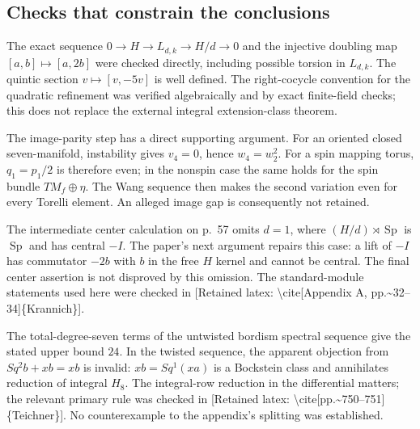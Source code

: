 \documentclass[10pt]{article}
\begin{document}
\subsection*{Checks that constrain the conclusions}
The exact sequence \(0\to H\to L_{d,k}\to H/d\to0\) and the injective doubling map \([a,b]\mapsto[a,2b]\) were checked directly, including possible torsion in \(L_{d,k}\). The quintic section \(v\mapsto[v,-5v]\) is well defined. The right-cocycle convention for the quadratic refinement was verified algebraically and by exact finite-field checks; this does not replace the external integral extension-class theorem.\par
The image-parity step has a direct supporting argument. For an oriented closed seven-manifold, instability gives \(v_4=0\), hence \(w_4=w_2^2\). For a spin mapping torus, \(q_1=p_1/2\) is therefore even; in the nonspin case the same holds for the spin bundle \(TM_f\oplus\eta\). The Wang sequence then makes the second variation even for every Torelli element. An alleged image gap is consequently not retained.\par
The intermediate center calculation on p. 57 omits \(d=1\), where \((H/d)\rtimes\operatorname{Sp}\) is \(\operatorname{Sp}\) and has central \(-I\). The paper’s next argument repairs this case: a lift of \(-I\) has commutator \(-2b\) with \(b\) in the free \(H\) kernel and cannot be central. The final center assertion is not disproved by this omission. The standard-module statements used here were checked in [Retained latex: \textbackslash{}cite[Appendix A, pp.\textasciitilde{}32--34]\{Krannich\}].\par
The total-degree-seven terms of the untwisted bordism spectral sequence give the stated upper bound \(24\). In the twisted sequence, the apparent objection from \(Sq^2b+xb=xb\) is invalid: \(xb=Sq^1(xa)\) is a Bockstein class and annihilates reduction of integral \(H_8\). The integral-row reduction in the differential matters; the relevant primary rule was checked in [Retained latex: \textbackslash{}cite[pp.\textasciitilde{}750--751]\{Teichner\}]. No counterexample to the appendix’s splitting was established.\par
\end{document}
